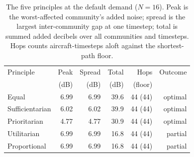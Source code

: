 \begin{table}[t]
\centering
\caption{The five principles at the default demand ($N{=}16$). Peak is the worst-affected community's added noise; spread is the largest inter-community gap at one timestep; total is summed added decibels over all communities and timesteps. Hops counts aircraft-timesteps aloft against the shortest-path floor.}
\label{tab:principles}
\begin{tabular}{lrrrrr}
\toprule
Principle & Peak & Spread & Total & Hops & Outcome \\
 & (dB) & (dB) & (dB) & (floor) & \\
\midrule
Equal & 6.99 & 6.99 & 39.6 & 44 (44) & optimal \\
Sufficientarian & 6.02 & 6.02 & 39.9 & 44 (44) & optimal \\
Prioritarian & 4.77 & 4.77 & 30.9 & 44 (44) & optimal \\
Utilitarian & 6.99 & 6.99 & 16.8 & 44 (44) & partial \\
Proportional & 6.99 & 6.99 & 16.8 & 44 (44) & partial \\
\bottomrule
\end{tabular}
\end{table}

